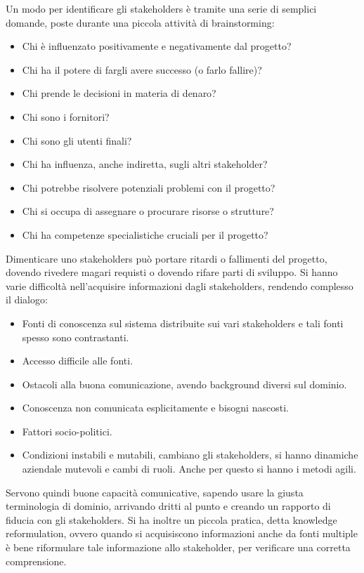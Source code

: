 Un modo per identificare gli stakeholders è tramite una serie di semplici
domande, poste durante una piccola attività di brainstorming:
\begin{itemize}
      \item Chi è influenzato positivamente e negativamente dal progetto?
      \item Chi ha il potere di fargli avere successo (o farlo fallire)?
      \item Chi prende le decisioni in materia di denaro?
      \item Chi sono i fornitori?
      \item Chi sono gli utenti finali?
      \item Chi ha influenza, anche indiretta, sugli altri stakeholder?
      \item Chi potrebbe risolvere potenziali problemi con il progetto?
      \item Chi si occupa di assegnare o procurare risorse o strutture?
      \item Chi ha competenze specialistiche cruciali per il progetto?
\end{itemize}
Dimenticare uno stakeholders può portare ritardi o fallimenti del progetto,
dovendo rivedere magari requisti o dovendo rifare parti di sviluppo. Si hanno
varie difficoltà nell'acquisire informazioni dagli stakeholders, rendendo
complesso il dialogo:
\begin{itemize}
      \item Fonti di conoscenza sul sistema distribuite sui vari stakeholders e
            tali fonti spesso sono contrastanti.
      \item Accesso difficile alle fonti.
      \item Ostacoli alla buona comunicazione, avendo background diversi sul
            dominio.
      \item Conoscenza non comunicata esplicitamente e bisogni nascosti.
      \item Fattori socio-politici.
      \item Condizioni instabili e mutabili, cambiano gli stakeholders, si hanno
            dinamiche aziendale mutevoli e cambi di ruoli. Anche per questo si
            hanno i metodi agili.
\end{itemize}
Servono quindi buone capacità comunicative, sapendo usare la giusta terminologia
di dominio, arrivando dritti al punto e creando un rapporto di fiducia con gli
stakeholders. Si ha inoltre un piccola pratica, detta knowledge reformulation,
ovvero quando si acquisiscono informazioni anche da fonti multiple è bene
riformulare tale informazione allo stakeholder, per verificare una corretta
comprensione.

